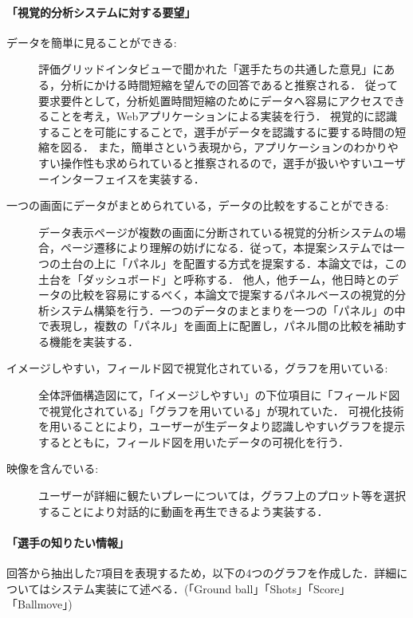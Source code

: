 \documentclass[sotsuron]{kuee}
\begin{document}
					\paragraph {「視覚的分析システムに対する要望」}
						\begin{description}
							\item [データを簡単に見ることができる:]
							評価グリッドインタビューで聞かれた「選手たちの共通した意見」にある，分析にかける時間短縮を望んでの回答であると推察される．
							従って要求要件として，分析処置時間短縮のためにデータへ容易にアクセスできることを考え，Webアプリケーションによる実装を行う．
							視覚的に認識することを可能にすることで，選手がデータを認識するに要する時間の短縮を図る．
							また，簡単さという表現から，アプリケーションのわかりやすい操作性も求められていると推察されるので，選手が扱いやすいユーザーインターフェイスを実装する．
							
							\item [一つの画面にデータがまとめられている，データの比較をすることができる:]
							データ表示ページが複数の画面に分断されている視覚的分析システムの場合，ページ遷移により理解の妨げになる．従って，本提案システムでは一つの土台の上に「パネル」を配置する方式を提案する．本論文では，この土台を「ダッシュボード」と呼称する．
							他人，他チーム，他日時とのデータの比較を容易にするべく，本論文で提案するパネルベースの視覚的分析システム構築を行う．一つのデータのまとまりを一つの「パネル」の中で表現し，複数の「パネル」を画面上に配置し，パネル間の比較を補助する機能を実装する．
							
							\item [イメージしやすい，フィールド図で視覚化されている，グラフを用いている:]
							全体評価構造図にて，「イメージしやすい」の下位項目に「フィールド図で視覚化されている」「グラフを用いている」が現れていた．
							可視化技術を用いることにより，ユーザーが生データより認識しやすいグラフを提示するとともに，フィールド図を用いたデータの可視化を行う．
							
							\item [映像を含んでいる:]
							ユーザーが詳細に観たいプレーについては，グラフ上のプロット等を選択することにより対話的に動画を再生できるよう実装する．
						\end{description}
					\paragraph {「選手の知りたい情報」}
						回答から抽出した7項目を表現するため，以下の4つのグラフを作成した．詳細についてはシステム実装にて述べる．(「Ground ball」「Shots」「Score」「Ballmove」)
\end{document}
